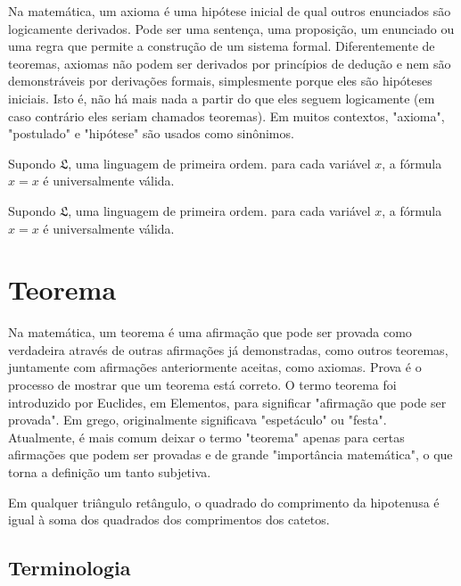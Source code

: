 Na matemática, um axioma é uma hipótese inicial de qual outros enunciados são logicamente derivados. Pode ser uma sentença, uma proposição, um enunciado ou uma regra que permite a construção de um sistema formal. Diferentemente de teoremas, axiomas não podem ser derivados por princípios de dedução e nem são demonstráveis por derivações formais, simplesmente porque eles são hipóteses iniciais. Isto é, não há mais nada a partir do que eles seguem logicamente (em caso contrário eles seriam chamados teoremas). Em muitos contextos, "axioma", "postulado" e "hipótese" são usados como sinônimos.


\begin{axioma}
	Supondo $\mathfrak{L}$, uma linguagem de primeira ordem. para cada variável $x$, a fórmula $x = x$ é universalmente válida.
\end{axioma}


\begin{postulado}
	Supondo $\mathfrak{L}$, uma linguagem de primeira ordem. para cada variável $x$, a fórmula $x = x$ é universalmente válida.
\end{postulado}


\section{Teorema}


Na matemática, um teorema é uma afirmação que pode ser provada como verdadeira através de outras afirmações já demonstradas, como outros teoremas, juntamente com afirmações anteriormente aceitas, como axiomas. Prova é o processo de mostrar que um teorema está correto. O termo teorema foi introduzido por Euclides, em Elementos, para significar "afirmação que pode ser provada". Em grego, originalmente significava "espetáculo" ou "festa". Atualmente, é mais comum deixar o termo "teorema" apenas para certas afirmações que podem ser provadas e de grande "importância matemática", o que torna a definição um tanto subjetiva.

\begin{teorema}
	Em qualquer triângulo retângulo, o quadrado do comprimento da hipotenusa é igual à soma dos quadrados dos comprimentos dos catetos. 
\end{teorema}


\subsection{Terminologia}



